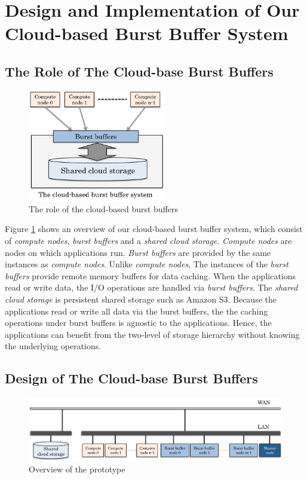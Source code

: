 \section{Design and Implementation of Our Cloud-based Burst Buffer System}
\label{sec:implementation}

\subsection{The Role of The Cloud-base Burst Buffers}
\begin{figure}[tb]
	\centering
	\includegraphics[width=6cm]{img/architecture_overview-2}
	\caption{The role of the cloud-based burst buffers}
	\label{architecture:overview}
\end{figure}

Figure \ref{architecture:overview} shows an overview of our cloud-based
burst buffer system, which consist of \emph{compute nodes}, \emph{burst buffers}
and a \emph{shared cloud storage}. \emph{Compute nodes} are nodes on which
applications run. \emph{Burst buffers} are provided by the same instances
as \emph{compute nodes}. Unlike \emph{compute nodes}, The instances
of the \emph{burst buffers} provide remote memory buffers for data caching.
When the applications read or write data, the I/O operations are handled via
\emph{burst buffers}.  The \emph{shared cloud storage} is persistent shared
storage such as Amazon S3.
Because the applications read or write all data via the burst buffers, the
the caching operations under burst buffers is agnostic to the applications.
Hence, the applications can benefit from the two-level of storage hierarchy
without knowing the underlying operations.

\subsection{Design of The Cloud-base Burst Buffers}
\begin{figure}
\centering
\includegraphics[width=16cm]{img/prototype_overview-2}
\caption{Overview of the prototype}
\label{implemetation:overview of prototype}
\end{figure}

